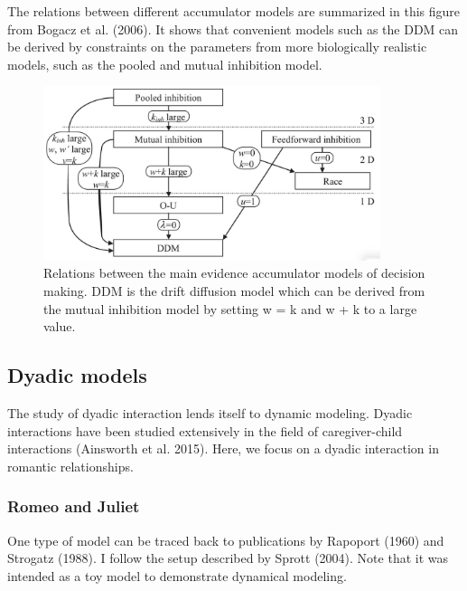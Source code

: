 \documentclass[
  letterpaper,
]{scrbook}
\begin{document}
The relations between different accumulator models are summarized in
this figure from Bogacz et al. (2006). It shows that convenient models
such as the DDM can be derived by constraints on the parameters from
more biologically realistic models, such as the pooled and mutual
inhibition model.

\begin{figure}

{\centering \includegraphics[width=3.88902in,height=\textheight]{media/ch5/image8.jpg}

}

\caption{\label{fig-ch5-img8-old-56}Relations between the main evidence
accumulator models of decision making. DDM is the drift diffusion model
which can be derived from the mutual inhibition model by setting w = k
and w + k to a large value.}

\end{figure}

\hypertarget{dyadic-models}{%
\subsection{Dyadic models}\label{dyadic-models}}

The study of dyadic interaction lends itself to dynamic modeling. Dyadic
interactions have been studied extensively in the field of
caregiver-child interactions (Ainsworth et al. 2015). Here, we focus on
a dyadic interaction in romantic relationships.

\hypertarget{romeo-and-juliet}{%
\subsubsection{Romeo and Juliet}\label{romeo-and-juliet}}

One type of model can be traced back to publications by Rapoport (1960)
and Strogatz (1988). I follow the setup described by Sprott (2004). Note
that it was intended as a toy model to demonstrate dynamical modeling.
\end{document}
